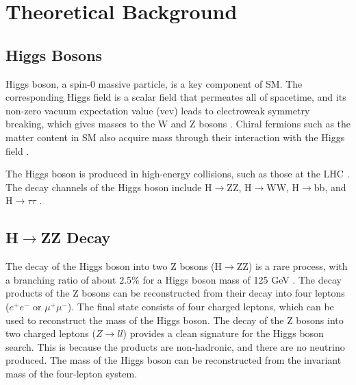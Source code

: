 \section{Theoretical Background}
\subsection{Higgs Bosons}
Higgs boson, a spin-0 massive particle, is a key component of SM. The corresponding Higgs field is a scalar field that permeates all of spacetime, and its non-zero vacuum expectation value (vev) leads to electroweak symmetry breaking, which gives masses to the W and Z bosons \cite{PeskinSchroeder1995, Weinberg1995}. Chiral fermions such as the matter content in SM also acquire mass through their interaction with the Higgs field \cite{PeskinSchroeder1995, Weinberg1995}. 

The Higgs boson is produced in high-energy collisions, such as those at the LHC \cite{CMS:2012qbp}. The decay channels of the Higgs boson include H$\rightarrow$ZZ, H$\rightarrow$WW, H$\rightarrow$bb, and H$\rightarrow$$\tau\tau$ \cite{Gunion:1990,PDG2023Higgs}. 

\subsection{H$\rightarrow$ZZ Decay}
The decay of the Higgs boson into two Z bosons (H$\rightarrow$ZZ) is a rare process, with a branching ratio of about 2.5\% for a Higgs boson mass of 125 GeV \cite{PDG2023Higgs}. The decay products of the Z bosons can be reconstructed from their decay into four leptons ($e^+e^-$ or $\mu^+\mu^-$). The final state consists of four charged leptons, which can be used to reconstruct the mass of the Higgs boson. The decay of the Z bosons into two charged leptons ($Z\rightarrow ll$) provides a clean signature for the Higgs boson search. This is because the products are non-hadronic, and there are no neutrino produced. The mass of the Higgs boson can be reconstructed from the invariant mass of the four-lepton system. 

